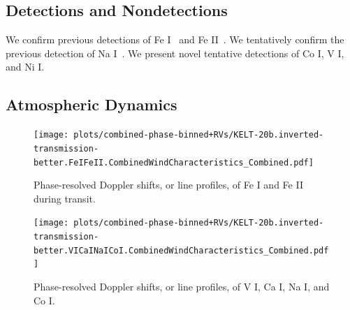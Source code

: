 \documentclass[twocolumn]{aastex631}
\begin{document}
        \subsection{Detections and Nondetections}\label{subsec:Detections}
            We confirm previous detections of Fe I~\citep{Nugroho2020} and Fe II~\citep{CasasayasBarris2020, Nugroho2020, BelloArufe2022}. We tentatively confirm the previous detection of Na I~\citep{CasasayasBarris2020, Nugroho2020, Sicilia2022}. We present novel tentative detections of Co I, V I, and Ni I.

        
        \subsection{Atmospheric Dynamics}\label{subsec:Atmospheric Dynamics}
            

            
        \begin{figure}[]\label{fig:FeI-II-Offset}
            \texttt{[image: plots/combined-phase-binned+RVs/KELT-20b.inverted-transmission-better.FeIFeII.CombinedWindCharacteristics\_Combined.pdf]}
            \caption{Phase-resolved Doppler shifts, or line profiles, of Fe I and Fe II during transit.}
            
        \end{figure}
        
        \begin{figure}[]\label{fig:VICaINaICoI-WindChars}
            \texttt{[image: plots/combined-phase-binned+RVs/KELT-20b.inverted-transmission-better.VICaINaICoI.CombinedWindCharacteristics\_Combined.pdf]}
            \caption{Phase-resolved Doppler shifts, or line profiles, of V I, Ca I, Na I, and Co I.}
            
        \end{figure}
        
\end{document}
